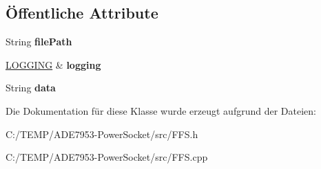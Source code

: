 \subsection*{Öffentliche Attribute}
\begin{DoxyCompactItemize}
\item 
\mbox{\label{class_f_f_sstring_file_aefe29a42415aeb8cbe9e3895df3af963}} 
String {\bfseries file\+Path}
\item 
\mbox{\label{class_f_f_sstring_file_a66b9cd649f3156cfe6287a97904ee0d0}} 
\hyperlink{class_l_o_g_g_i_n_g}{L\+O\+G\+G\+I\+NG} \& {\bfseries logging}
\item 
\mbox{\label{class_f_f_sstring_file_afa75bd6ea7c9a0cfbe1d5956c340c603}} 
String {\bfseries data}
\end{DoxyCompactItemize}


Die Dokumentation für diese Klasse wurde erzeugt aufgrund der Dateien\+:\begin{DoxyCompactItemize}
\item 
C\+:/\+T\+E\+M\+P/\+A\+D\+E7953-\/\+Power\+Socket/src/F\+F\+S.\+h\item 
C\+:/\+T\+E\+M\+P/\+A\+D\+E7953-\/\+Power\+Socket/src/F\+F\+S.\+cpp\end{DoxyCompactItemize}
